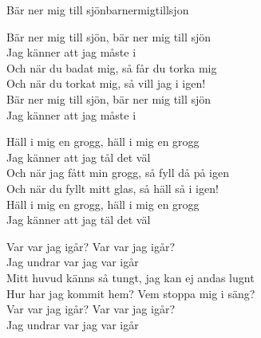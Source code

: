 \begin{song}{Bär ner mig till sjön}{barnermigtillsjon}
\begin{vers}
\repopen Bär ner mig till sjön, bär ner mig till sjön\\
Jag känner att jag måste i \repclose\\
Och när du badat mig, så får du torka mig\\
Och när du torkat mig, så vill jag i igen!\\
Bär ner mig till sjön, bär ner mig till sjön\\
Jag känner att jag måste i\\
\end{vers}
\begin{vers}
\repopen Häll i mig en grogg, häll i mig en grogg\\
Jag känner att jag tål det väl \repclose\\
Och när jag fått min grogg, så fyll då på igen\\
Och när du fyllt mitt glas, så häll så i igen!\\
Häll i mig en grogg, häll i mig en grogg\\
Jag känner att jag täl det väl\\
\end{vers}
\begin{vers}
\repopen Var var jag igår? Var var jag igår? \\
Jag undrar var jag var igår \repclose\\
Mitt huvud känns så tungt, jag kan ej andas lugnt\\
Hur har jag kommit hem? Vem stoppa mig i säng?\\
Var var jag igår? Var var jag igår?\\
Jag undrar var jag var igår\\
\end{vers}
\end{song}
